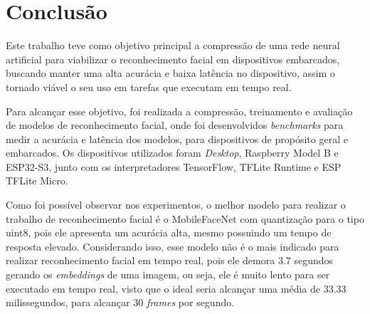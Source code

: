 \chapter{Conclusão}

Este trabalho teve como objetivo principal a compressão de uma rede neural artificial para viabilizar o
reconhecimento facial em dispositivos embarcados, buscando manter uma alta acurácia e baixa latência no
dispositivo, assim o tornado viável o seu uso em tarefas que executam em tempo real.

Para alcançar esse objetivo, foi realizada a compressão, treinamento e avaliação de modelos de reconhecimento
facial, onde foi desenvolvidos \textit{benchmarks} para medir a acurácia e latência dos modelos, para
dispositivos de propósito geral e embarcados. Os dispositivos utilizados foram \textit{Desktop}, Raspberry
Model B e ESP32-S3, junto com os interpretadores TensorFlow, TFLite Runtime e ESP TFLite Micro.

Como foi possível observar nos experimentos, o melhor modelo para realizar o trabalho de reconhecimento
facial é o MobileFaceNet com quantização para o tipo uint8, pois ele apresenta um acurácia alta, mesmo possuindo
um tempo de resposta elevado. Considerando isso, esse modelo não é o mais indicado para realizar reconhecimento
facial em tempo real, pois ele demora 3.7 segundos gerando os \textit{embeddings} de uma imagem, ou seja, ele
é muito lento para ser executado em tempo real, visto que o ideal seria alcançar uma média de 33.33
milissegundos, para alcançar 30 \textit{frames} por segundo.


